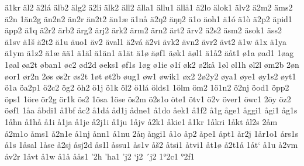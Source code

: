 ä1kr
äl2
ä2lá
älb2
älg2
ä2li
älk2
äll2
älla1
ällu1
ällå1
ä2lo
älok1
älv2
ä2m2
äms2
ä2n
1än2g
än2n2
än2r
än2t2
än1æ
ä1nå
ä2ŋ2
äŋŋ2
ä1o
äoh1
ä1ó
ä1ò
ä2p2
äpid1
äpp2
ä1q
ä2r2
ärb2
ärg2
ärj2
ärk2
ärm2
ärn2
ärt2
ärv2
ä2s2
äsm2
äsok1
äss2
ä1sv
ä1š
ä2t2
ä1u
äuo1
äv2
äval1
ä2vá
ä2vi
ävk2
ävn2
ävr2
ävt2
ä1w
ä1x
ä1ya
ä1ym
ä1z2
ä1æ
ää1
ä1äl
ä1än1
ä1ät
ä1ø
äøf1
äøk1
äøl1
ä1å2
äåt1
ø1a
øad1
1øag
1øal
øa2t
øban1
øc2
ød2d
øeks1
øf1s
1øg
ø1ie
ø1í
øk2
ø2kå
1øl
øl1h
øl2l
øm2b
2øn
øor1
ør2n
2øs
øs2r
øs2t
1øt
øt2b
øug1
øw1
øwik1
øx2
2ø2y2
øya1
øye1
øy1s2
øyt1
ö1a
öa2p1
ö2c2
ög2
öh2
ö1j
ö1k
öl2
ö1lá
ölds1
1ölm
öm2
1ö1n2
ö2nj
öod1
öpp2
öps1
1öre
ör2g
ör1k
ös2
1ösa
1öse
ös2m
ö2s1o
öte1
ötv1
ö2v
över1
öwc1
2öy
öz2
öøf1
1åa
åbdi1
å1bf
åc2
å1dá
åd1j
ådne1
å1do
åek1
å1f2
å1g
åge1
åggi1
ågi1
åg1s
1åhn
å1hå
å1i
å1ja
å1je
å2j1i
å1ju
1åjv
å2k1
åkie1
å1kr
1åkri
1åkt
ål2s
2åm
å2m1o
åms1
å2n1e
å1nj
ånn1
å1nu
2åŋ
åŋgi1
å1o
åp2
åpe1
åpt1
år2j
1år1o1
års1s
å1s
1åsal
1åse
å2sj
åsj2d
ås1l
åssu1
ås1v
åš2
åtsi1
åtvi1
åt1ø
å2t1å
1åt`
å1u
å2vm
åv2r
1åvt
å1w
å1å
åås1
'2h
'ha1
'j2
`j2
´j2
1°2c1
°2f1
